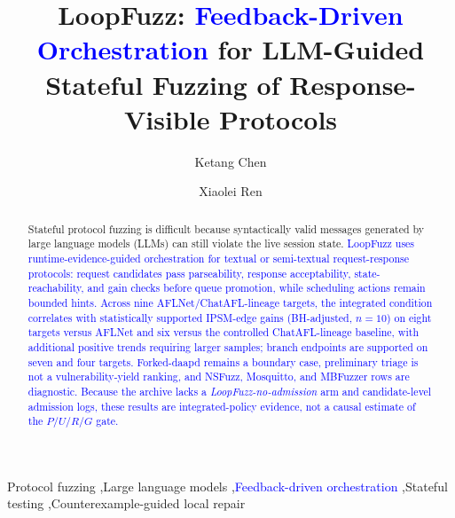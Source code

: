 \documentclass[final,5p,times,number]{elsarticle}
\begin{document}
\begin{frontmatter}

\title{LoopFuzz: \textcolor{blue}{Feedback-Driven Orchestration} for LLM-Guided Stateful Fuzzing of Response-Visible Protocols}

\author[inst1]{Ketang Chen}
\author[inst1]{Xiaolei Ren}


\begin{abstract}
Stateful protocol fuzzing is difficult because syntactically valid messages generated by large language models (LLMs) can still violate the live session state. \textcolor{blue}{LoopFuzz uses runtime-evidence-guided orchestration for textual or semi-textual request-response protocols: request candidates pass parseability, response acceptability, state-reachability, and gain checks before queue promotion, while scheduling actions remain bounded hints. Across nine AFLNet/ChatAFL-lineage targets, the integrated condition correlates with statistically supported IPSM-edge gains (BH-adjusted, $n=10$) on eight targets versus AFLNet and six versus the controlled ChatAFL-lineage baseline, with additional positive trends requiring larger samples; branch endpoints are supported on seven and four targets. Forked-daapd remains a boundary case, preliminary triage is not a vulnerability-yield ranking, and NSFuzz, Mosquitto, and MBFuzzer rows are diagnostic. Because the archive lacks a \emph{LoopFuzz-no-admission} arm and candidate-level admission logs, these results are integrated-policy evidence, not a causal estimate of the $P/U/R/G$ gate.}
\end{abstract}

\begin{keyword}
Protocol fuzzing \sep Large language models \sep \textcolor{blue}{Feedback-driven orchestration} \sep Stateful testing \sep Counterexample-guided local repair
\end{keyword}

\end{frontmatter}
\small
\end{document}
